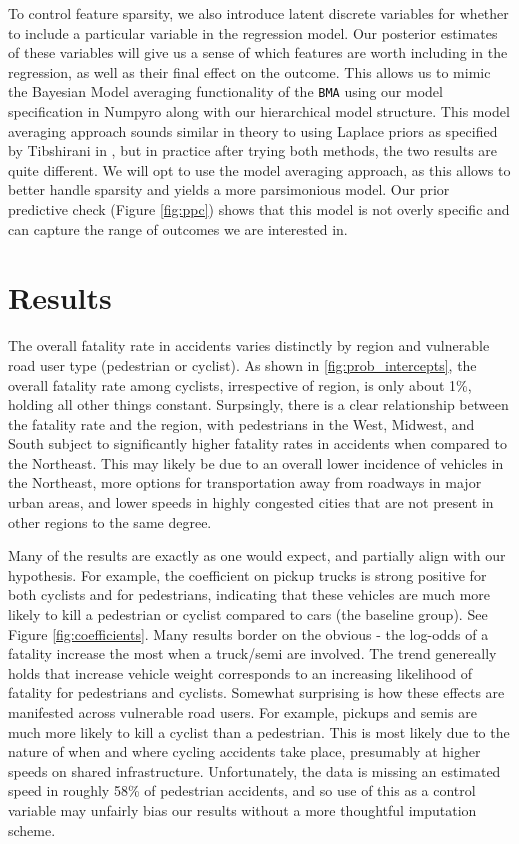 \documentclass[12pt]{article}
\begin{document}
To control feature sparsity, we also introduce latent discrete variables for whether to include a particular
variable in the regression model. Our posterior estimates of these variables will give us a sense of which features
are worth including in the regression, as well as their final effect on the outcome. This allows us to mimic the
Bayesian Model averaging functionality of the \texttt{BMA}\cite{raftery_bma_2022} using our model specification in
Numpyro\cite{phan_composable_2019} along with our hierarchical model structure. This model averaging approach sounds
similar in theory to using Laplace priors as specified by Tibshirani in \cite{tibshirani_regression_1996},
but in practice after trying both methods, the two results are quite different. We will opt to use the model
averaging approach, as this allows to better handle sparsity and yields a more parsimonious model.
Our prior predictive check (Figure \ref{fig:ppc}) shows that this model is not overly specific and can capture the
range of outcomes we are interested in.

\section{Results}

The overall fatality rate in accidents varies distinctly by region and vulnerable road user
type (pedestrian or cyclist). As shown in \ref{fig:prob_intercepts}, the overall fatality rate
among cyclists, irrespective of region, is only about 1\%, holding all other things constant. Surpsingly,
there is a clear relationship between the fatality rate and the region, with pedestrians in the West, Midwest, and South
subject to significantly higher fatality rates in accidents when compared to the Northeast. This may likely
be due to an overall lower incidence of vehicles in the Northeast, more options for transportation away from roadways
in major urban areas, and lower speeds in highly congested cities that are not present in other regions to the
same degree.

Many of the results are exactly as one would expect, and partially align with our hypothesis. For example, the
coefficient on pickup trucks is strong positive for both cyclists and for pedestrians, indicating that these vehicles
are much more likely to kill a pedestrian or cyclist compared to cars (the baseline group). See
Figure \ref{fig:coefficients}. Many results border on the obvious - the log-odds of a fatality increase the most when
a truck/semi are involved. The trend genereally holds that increase vehicle weight corresponds to an increasing
likelihood of fatality for pedestrians and cyclists. Somewhat surprising is how these effects are manifested across
vulnerable road users. For example, pickups and semis are much more likely to kill a cyclist than a pedestrian. This is
most likely due to the nature of when and where cycling accidents take place, presumably at higher speeds on shared
infrastructure. Unfortunately, the data is missing an estimated speed in roughly 58\% of pedestrian accidents, and so
use of this as a control variable may unfairly bias our results without a more thoughtful imputation scheme.
\end{document}
